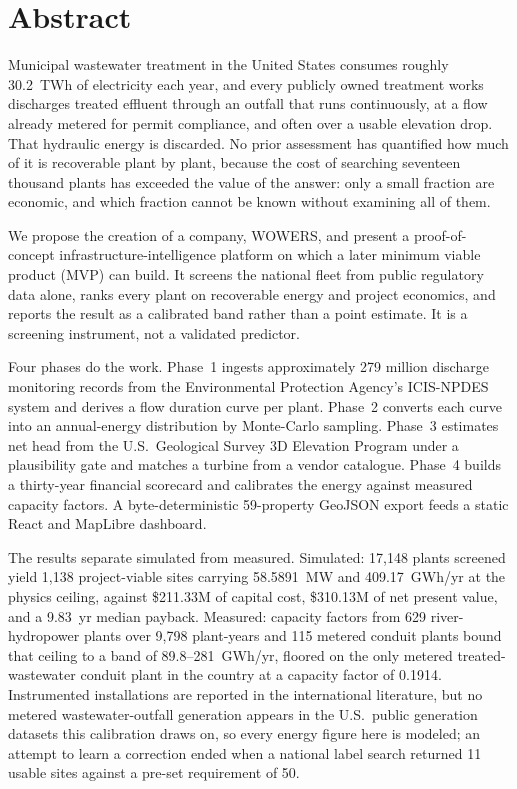 \documentclass[12pt,letterpaper]{report}
\begin{document}
\chapter*{Abstract}
Municipal wastewater treatment in the United States consumes roughly 30.2~TWh of
electricity each year, and every publicly owned treatment works discharges treated
effluent through an outfall that runs continuously, at a flow already metered
for permit compliance, and often over a usable elevation drop. That hydraulic
energy is discarded. No prior assessment has quantified how much of it is recoverable
plant by plant, because the cost of searching seventeen thousand plants has exceeded
the value of the answer: only a small fraction are economic, and which fraction cannot
be known without examining all of them.

We propose the creation of a company, WOWERS, and present a proof-of-concept
infrastructure-intelligence platform on which a later minimum viable product
(MVP) can build. It screens the national fleet from public regulatory data
alone, ranks every plant on recoverable energy and project economics, and reports the
result as a calibrated band rather than a point estimate. It is a screening instrument,
not a validated predictor.

Four phases do the work. Phase~1 ingests approximately 279 million discharge
monitoring records from the Environmental Protection Agency's ICIS-NPDES system and
derives a flow duration curve per plant. Phase~2 converts each curve into an
annual-energy distribution by Monte-Carlo sampling. Phase~3 estimates net head from the
U.S.\ Geological Survey 3D Elevation Program under a plausibility gate and matches a
turbine from a vendor catalogue. Phase~4 builds a thirty-year financial scorecard and
calibrates the energy against measured capacity factors. A byte-deterministic
59-property GeoJSON export feeds a static React and MapLibre dashboard.

The results separate simulated from measured. Simulated: 17{,}148 plants screened yield
1{,}138 project-viable sites carrying 58.5891~MW and 409.17~GWh/yr at the physics
ceiling, against \$211.33M of capital cost, \$310.13M of net present value, and a
9.83~yr median payback. Measured: capacity factors from 629 river-hydropower plants over
9{,}798 plant-years and 115 metered conduit plants bound that ceiling to a band of
89.8--281~GWh/yr, floored on the only metered treated-wastewater conduit plant in the
country at a capacity factor of 0.1914. Instrumented installations are reported in the
international literature, but no metered wastewater-outfall generation
appears in the U.S.\ public generation datasets this calibration draws on, so every
energy figure here is modeled; an attempt to learn a correction ended when a national
label search returned 11 usable sites against a pre-set requirement of 50.
\end{document}
